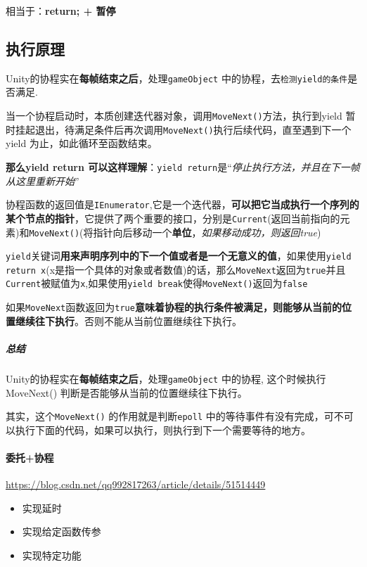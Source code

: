 \documentclass[UTF8,a4paper,12pt]{ctexbook}
\begin{document}
				\color{blue}相当于：\textbf{return; + 暂停}\color{black}
				
		\subsection{执行原理}
			Unity的协程实在\textbf{每帧结束之后}，处理\verb|gameObject| 中的协程，去\verb|检测yield的条件|是否满足.
		
			当一个协程启动时，本质创建迭代器对象，调用\verb|MoveNext()|方法，执行到yield 暂时挂起退出，待满足条件后再次调用\verb|MoveNext()|执行后续代码，直至遇到下一个yield 为止，如此循环至函数结束。
			
			\textbf{那么yield return 可以这样理解}：\verb|yield return|是“\textit{停止执行方法，并且在下一帧从这里重新开始}”
			
			协程函数的返回值是\verb|IEnumerator|,它是一个迭代器，\textbf{可以把它当成执行一个序列的某个节点的指针}，它提供了两个重要的接口，分别是\verb|Current|(返回当前指向的元素)和\verb|MoveNext()|(将指针向后移动一个\textbf{单位}，\textit{如果移动成功，则返回true})
			
			\verb|yield|关键词\textbf{用来声明序列中的下一个值或者是一个无意义的值}，如果使用\verb|yield return x|(x是指一个具体的对象或者数值)的话，那么\verb|MoveNext|返回为\verb|true|并且\verb|Current|被赋值为\verb|x|,如果使用\verb|yield break|使得\verb|MoveNext()|返回为\verb|false|
			
			如果\verb|MoveNext|函数返回为\verb|true|\textbf{意味着协程的执行条件被满足，则能够从当前的位置继续往下执行}。否则不能从当前位置继续往下执行。	
			
			

			\subparagraph{总结}
				Unity的协程实在\textbf{每帧结束之后}，处理\verb|gameObject| 中的协程, 这个时候执行MoveNext() 判断是否能够从当前的位置继续往下执行。
				
				其实，这个\verb|MoveNext()| 的作用就是判断\verb|epoll| 中的等待事件有没有完成，可不可以执行下面的代码，如果可以执行，则执行到下一个需要等待的地方。
			
			
	\paragraph{委托+协程}
		\url{https://blog.csdn.net/qq992817263/article/details/51514449}
		
		\begin{itemize}
			\item 实现延时
			\item 实现给定函数传参
			\item 实现特定功能
		\end{itemize}
	
\end{document}
